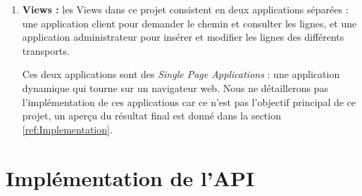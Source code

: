 \begin{enumerate}
	\item \textbf{Views :} les Views dans ce projet consistent en deux applications séparées : une application client pour demander le chemin et consulter les lignes, et une application administrateur pour insérer et modifier les lignes des différents transports.
	      
	      Ces deux applications sont des \emph{Single Page Applications} : une application dynamique qui tourne sur un navigateur web.
	      Nous ne détaillerons pas l'implémentation de ces applications car ce n'est pas l'objectif principal de ce projet, un aperçu du résultat final est donné dans la section \ref{ref:Implementation}.
\end{enumerate}
	
	
	
\section{Implémentation de l'API}
\label{ref:API}
